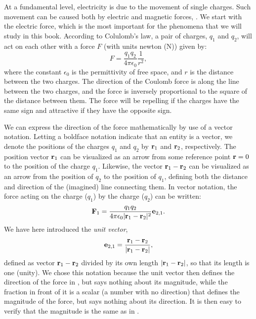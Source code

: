 At a fundamental level, electricity is due to the movement of single charges. Such movement can be caused both by electric and magnetic forces, . We start with the electric force, which is the most important for the phenomena that we will study in this book. According to Colulomb's law, a pair of charges, $q_1$ and $q_2$, will act on each other with a force $F$ (with units newton (\si{\newton})) given by:
\begin{equation}
F = \frac{q_1q_2}{4\pi \epsilon_0} \frac{1}{r^2},
\label{eq:Basics:CoulombF}
\end{equation}
where the constant $\epsilon_0$ is the permittivity of free space, and $r$ is the distance between the two charges. The direction of the Coulomb force is along the line between the two charges, and the force is inversely proportional to the square of the distance between them. The force will be repelling if the charges have the same sign and attractive if they have the opposite sign. 

We can express the direction of the force mathematically by use of a vector notation. Letting a boldface notation indicate that an entity is a vector, we denote the positions of the charges $q_1$ and $q_2$ by ${\bf r}_1$ and ${\bf r}_2$, respectively. The position vector ${\bf r}_1$ can be visualized as an arrow from some reference point ${\bf r} =0$ to the position of the charge $q_1$. Likewise, the vector ${\bf r}_1-{\bf r}_2$ can be visualized as an arrow from the position of $q_2$ to the position of $q_1$, defining both the distance and direction of the (imagined) line connecting them. In vector notation, the force acting on the charge ($q_1$) by the charge ($q_2$) can be written:
\begin{equation}
{\bf F}_{1} = \frac{q_1q_2}{4\pi \epsilon_0 |{\bf r}_1-{\bf r}_2|^2} {{\bf e}}_{2,1}.
\label{eq:Basics:CoulombFvec}
\end{equation}
We have here introduced the \textit{unit vector},
\begin{equation}
{{\bf e}}_{2,1} = \frac{{\bf r}_1 - {\bf r}_2}{|{\bf r}_1-{\bf r}_2|},
\label{eq:Basics:UnitVector}
\end{equation}
defined as vector ${\bf r}_1-{\bf r}_2$ divided by its own length $|{\bf r}_1-{\bf r}_2|$, so that its length is one (unity). We chose this notation because the unit vector then defines the direction of the force in , but says nothing about its magnitude, while the fraction in front of it is a scalar (a number with no direction) that defines the magnitude of the force, but  says nothing about its direction. It is then easy to verify that the magnitude is the same as in .


